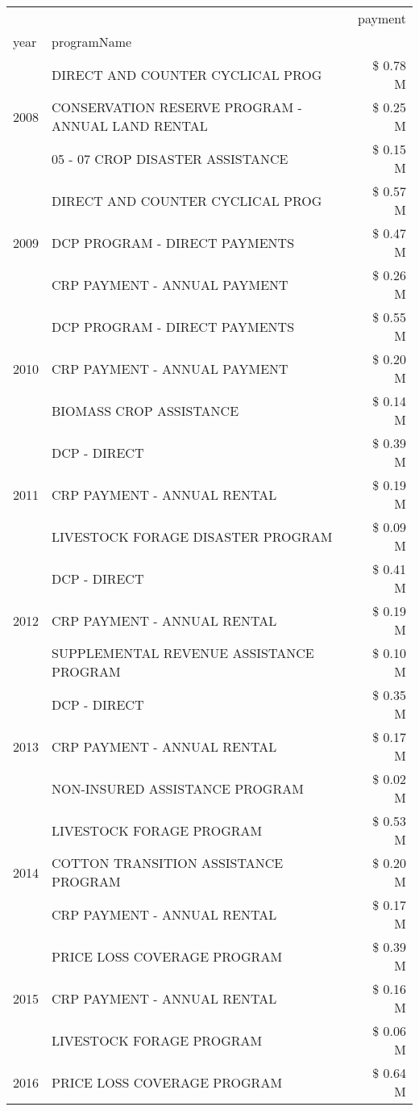 \begin{tabular}{llr}
\toprule
 &  & payment \\
year & programName &  \\
\midrule
\multirow[t]{3}{*}{2008} & DIRECT AND COUNTER CYCLICAL PROG & \$ 0.78 M \\
 & CONSERVATION RESERVE PROGRAM - ANNUAL LAND RENTAL & \$ 0.25 M \\
 & 05 - 07 CROP DISASTER ASSISTANCE & \$ 0.15 M \\
\cline{1-3}
\multirow[t]{3}{*}{2009} & DIRECT AND COUNTER CYCLICAL PROG & \$ 0.57 M \\
 & DCP PROGRAM - DIRECT PAYMENTS & \$ 0.47 M \\
 & CRP PAYMENT - ANNUAL PAYMENT & \$ 0.26 M \\
\cline{1-3}
\multirow[t]{3}{*}{2010} & DCP PROGRAM - DIRECT PAYMENTS & \$ 0.55 M \\
 & CRP PAYMENT - ANNUAL PAYMENT & \$ 0.20 M \\
 & BIOMASS CROP ASSISTANCE & \$ 0.14 M \\
\cline{1-3}
\multirow[t]{3}{*}{2011} & DCP - DIRECT & \$ 0.39 M \\
 & CRP PAYMENT - ANNUAL RENTAL & \$ 0.19 M \\
 & LIVESTOCK FORAGE DISASTER PROGRAM & \$ 0.09 M \\
\cline{1-3}
\multirow[t]{3}{*}{2012} & DCP - DIRECT & \$ 0.41 M \\
 & CRP PAYMENT - ANNUAL RENTAL & \$ 0.19 M \\
 & SUPPLEMENTAL REVENUE ASSISTANCE PROGRAM & \$ 0.10 M \\
\cline{1-3}
\multirow[t]{3}{*}{2013} & DCP - DIRECT & \$ 0.35 M \\
 & CRP PAYMENT - ANNUAL RENTAL & \$ 0.17 M \\
 & NON-INSURED ASSISTANCE PROGRAM & \$ 0.02 M \\
\cline{1-3}
\multirow[t]{3}{*}{2014} & LIVESTOCK FORAGE PROGRAM & \$ 0.53 M \\
 & COTTON TRANSITION ASSISTANCE PROGRAM & \$ 0.20 M \\
 & CRP PAYMENT - ANNUAL RENTAL & \$ 0.17 M \\
\cline{1-3}
\multirow[t]{3}{*}{2015} & PRICE LOSS COVERAGE PROGRAM & \$ 0.39 M \\
 & CRP PAYMENT - ANNUAL RENTAL & \$ 0.16 M \\
 & LIVESTOCK FORAGE PROGRAM & \$ 0.06 M \\
\cline{1-3}
\multirow[t]{3}{*}{2016} & PRICE LOSS COVERAGE PROGRAM                   & \$ 0.64 M \\

\end{tabular}
